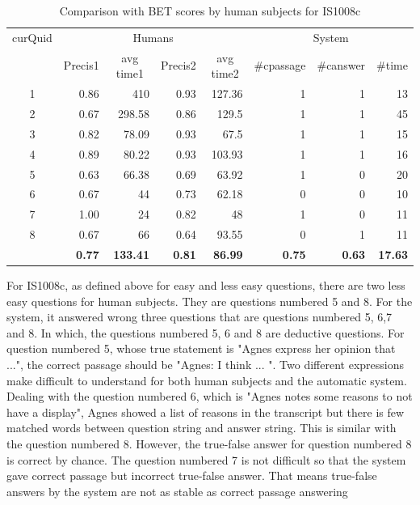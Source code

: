 \documentclass[10pt,a4paper]{article}
\numberwithin{algorithm}{section}  %
\begin{document}
\begin{table}[ht!]
\scriptsize
\caption{Comparison with BET scores by human subjects for IS1008c}
\begin{tabular}{|c|r|r|r|r|r|r|r|}
\hline
\multicolumn{ 1}{|c|}{curQuid} & \multicolumn{ 4}{c|}{Humans} & \multicolumn{ 3}{c|}{System} \\ \cline{ 2- 8}
\multicolumn{ 1}{|l|}{} & \multicolumn{1}{c|}{Precis1} & \multicolumn{1}{c|}{avg time1} & \multicolumn{1}{c|}{Precis2} & \multicolumn{1}{c|}{avg time2} & \multicolumn{1}{c|}{\#cpassage} & \multicolumn{1}{c|}{\#canswer} & \multicolumn{1}{c|}{\#time} \\ \hline
1 & 0.86 & 410 & 0.93 & 127.36 & 1 & 1 & 13 \\ \hline
2 & 0.67 & 298.58 & 0.86 & 129.5 & 1 & 1 & 45 \\ \hline
3 & 0.82 & 78.09 & 0.93 & 67.5 & 1 & 1 & 15 \\ \hline
4 & 0.89 & 80.22 & 0.93 & 103.93 & 1 & 1 & 16 \\ \hline
5 & 0.63 & 66.38 & 0.69 & 63.92 & 1 & 0 & 20 \\ \hline
6 & 0.67 & 44 & 0.73 & 62.18 & 0 & 0 & 10 \\ \hline
7 & 1.00 & 24 & 0.82 & 48 & 1 & 0 & 11 \\ \hline
8 & 0.67 & 66 & 0.64 & 93.55 & 0 & 1 & 11 \\ \hline
\multicolumn{1}{|l|}{} & \textbf{0.77} & \textbf{133.41} & \textbf{0.81} & \textbf{86.99} & \textbf{0.75} & \textbf{0.63} & \textbf{17.63} \\ \hline
\end{tabular}
\label{table: BET scores for IS1008c}
\end{table}

For IS1008c, as defined above for easy and less easy questions, there are two less easy questions for human subjects. They are questions numbered 5 and 8. For the system, it answered wrong three questions that are questions numbered 5, 6,7 and 8. In which, the questions numbered 5, 6 and 8 are deductive questions. For question numbered 5, whose true statement is "Agnes express her opinion that ...", the correct passage should be "Agnes: I think ... ". Two different expressions make difficult to understand for both human subjects and the automatic system. Dealing with the question numbered 6, which is "Agnes notes some reasons to not have a display", Agnes showed a list of reasons in the transcript but there is few matched words between question string and answer string. This is similar with the question numbered 8. However, the true-false answer for question numbered 8 is correct by chance. The question numbered 7 is not difficult so that the system gave correct passage but incorrect true-false answer. That means true-false answers by the system are not as stable as correct passage answering
\end{document}

